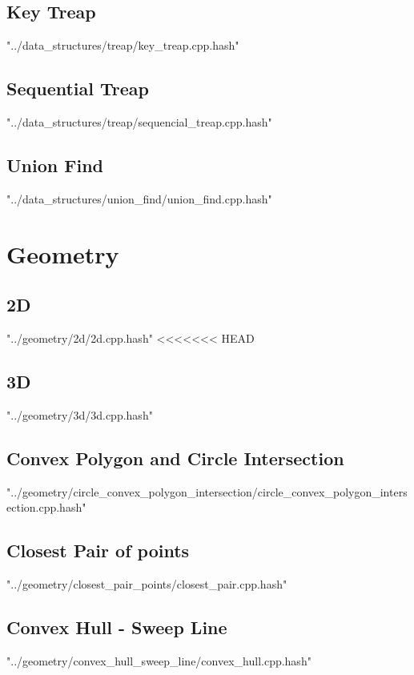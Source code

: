 \documentclass [12pt,onecolumn,oneside]{article}
\begin{document}
\subsection{ Key Treap}
 {"../data_structures/treap/key_treap.cpp.hash"}
\newpage

\subsection{ Sequential Treap}
 {"../data_structures/treap/sequencial_treap.cpp.hash"}
\newpage

\subsection{ Union Find}
 {"../data_structures/union_find/union_find.cpp.hash"}
\newpage


\section{Geometry}
\subsection{ 2D}
 {"../geometry/2d/2d.cpp.hash"}
<<<<<<< HEAD
\newpage

\subsection{ 3D}
 {"../geometry/3d/3d.cpp.hash"}
\newpage

\subsection{ Convex Polygon and Circle Intersection}
 {"../geometry/circle_convex_polygon_intersection/circle_convex_polygon_intersection.cpp.hash"}
\newpage

\subsection{ Closest Pair of points}
 {"../geometry/closest_pair_points/closest_pair.cpp.hash"}
\newpage

\subsection{ Convex Hull - Sweep Line}
 {"../geometry/convex_hull_sweep_line/convex_hull.cpp.hash"}
\newpage
\end{document}
